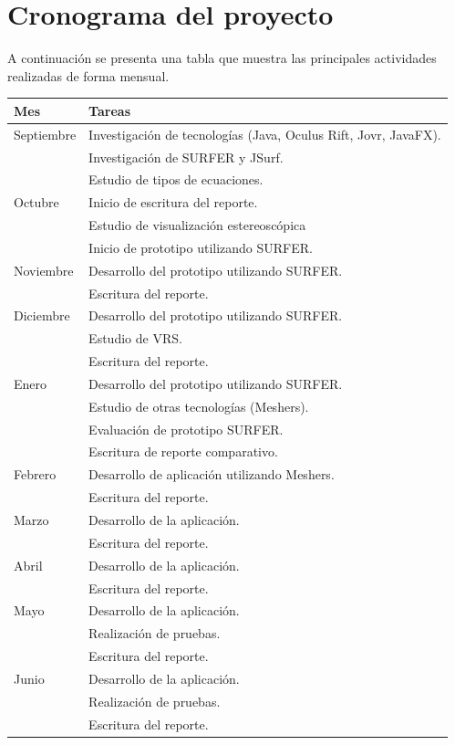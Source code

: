 \documentclass[12pt]{article}
\begin{document}
\section{Cronograma del proyecto}
A continuación se presenta una tabla que muestra las principales actividades realizadas de forma mensual.
\begin{center}
    \begin{tabular}{ | l | p{9cm} |}
    \hline
    Mes &   Tareas \\ \hline
    Septiembre &  Investigación de tecnologías (Java, Oculus Rift, Jovr, JavaFX).\\ & Investigación de SURFER y JSurf. \\ & Estudio de tipos de ecuaciones.\\ \hline
    Octubre &  Inicio de escritura del reporte. \\ & Estudio de visualización estereoscópica \\ & Inicio de prototipo utilizando SURFER. \\ \hline
    Noviembre &  Desarrollo del prototipo utilizando SURFER.\\ & Escritura del reporte. \\ \hline
    Diciembre &  Desarrollo del prototipo utilizando SURFER.\\ & Estudio de VRS.\\ & Escritura del reporte. \\ \hline
    Enero &   Desarrollo del prototipo utilizando SURFER.\\ & Estudio de otras tecnologías (Meshers).\\ &  Evaluación de prototipo SURFER.\\ & Escritura de reporte comparativo.\\ \hline
    Febrero  & Desarrollo de aplicación utilizando Meshers. \\ & Escritura del reporte. \\ \hline
    Marzo &  Desarrollo de la aplicación.\\ & Escritura del reporte. \\ \hline
    Abril &  Desarrollo de la aplicación.\\ & Escritura del reporte. \\ \hline
    Mayo &  Desarrollo de la aplicación.\\ &  Realización de pruebas.\\ & Escritura del reporte. \\ \hline
    Junio &  Desarrollo de la aplicación.\\ &  Realización de pruebas.\\ & Escritura del reporte. \\ \hline
    \hline
    \end{tabular}
\end{center}
\clearpage
\end{document}
